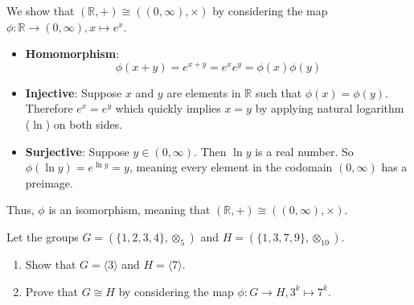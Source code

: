 \begin{example}
    We show that $(\mathbb{R}, +) \cong ((0, \infty), \times)$ by considering the map $\phi: \mathbb{R} \to (0, \infty), x \mapsto e^x$.
    \begin{itemize}
        \item \textbf{Homomorphism}:
        \[
            \phi(x+y) = e^{x+y} = e^xe^y = \phi(x)\phi(y)
        \]
        \item \textbf{Injective}: Suppose $x$ and $y$ are elements in $\mathbb{R}$ such that $\phi(x) = \phi(y)$. Therefore $e^x = e^y$ which quickly implies $x = y$ by applying natural logarithm ($\ln$) on both sides.
        \item \textbf{Surjective}: Suppose $y \in (0, \infty)$. Then $\ln y$ is a real number. So $\phi(\ln y) = e^{\ln y} = y$, meaning every element in the codomain $(0, \infty)$ has a preimage.
    \end{itemize}

    Thus, $\phi$ is an isomorphism, meaning that $(\mathbb{R}, +) \cong ((0, \infty), \times)$.
\end{example}

\begin{exercise}
    Let the groups $G = (\{1, 2, 3, 4\}, \otimes_5)$ and $H = (\{1, 3, 7, 9\}, \otimes_{10})$.
    \begin{enumerate}[label=(\roman*)]
        \item Show that $G = \langle 3 \rangle$ and $H = \langle 7 \rangle$.
        \item Prove that $G \cong H$ by considering the map $\phi: G \to H, 3^k \mapsto 7^k$.
    \end{enumerate}
\end{exercise}

